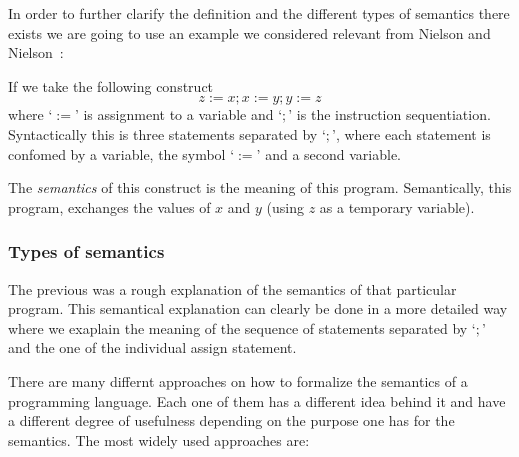 In order to further clarify the definition and the different types of semantics there exists we are going to use an example we considered relevant from Nielson and Nielson~\parencite{nielson}:

If we take the following construct
\begin{equation*}
z:=x; x:=y; y:=z
\end{equation*}
where `$:=$' is assignment to a variable and `$;$' is the instruction sequentiation.
Syntactically this is three statements separated by `$;$', where each statement is confomed by a variable, the symbol `$:=$' and a second variable.

The \textit{semantics} of this construct is the meaning of this program.
Semantically, this program, exchanges the values of $x$ and $y$ (using $z$ as a temporary variable).

\subsubsection{Types of semantics}

The previous was a rough explanation of the semantics of that particular program.
This semantical explanation can clearly be done in a more detailed way where we exaplain the meaning of the sequence of statements separated by `$;$' and the one of the individual assign statement.

There are many differnt approaches on how to formalize the semantics of a programming language.
Each one of them has a different idea behind it and have a different degree of usefulness depending on the purpose one has for the semantics.
The most widely used approaches are:

\begin{comment}
\begin{itemize}
\item{Operational semantics:}
The meaning is specified by the computation on a machine when executing the program.
The interest lies on the ``\textit{how} the effect of a computation is produced.''~\parencite{nielson}
\item{Denotational semantics:}
The meaning of a construct are modelled mathematically by objects that represent the effect of executing the construct.
Here the main interest lies in the effect and not how it was obtained.
\item{Axiomatic semantics:}
Here the main interest lies in expressing some properties of the construct in the form of assertions.
\end{itemize}
\end{comment}

